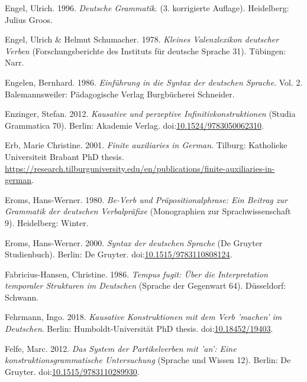 \leavevmode{}%
Engel, Ulrich. 1996. \emph{Deutsche {Grammatik}}. (3. korrigierte
Auflage). Heidelberg: Julius Groos.

\leavevmode{}%
Engel, Ulrich \& Helmut Schumacher. 1978. \emph{Kleines {Valenzlexikon}
deutscher {Verben}} ({Forschungsberichte des Instituts für deutsche
Sprache} 31). Tübingen: Narr.

\leavevmode{}%
Engelen, Bernhard. 1986. \emph{Einführung in die {Syntax} der deutschen
{Sprache}}. Vol. 2. Balemannsweiler: Pädagogische Verlag Burgbücherei
Schneider.

\leavevmode{}%
Enzinger, Stefan. 2012. \emph{Kausative und perzeptive
{Infinitivkonstruktionen}} (Studia Grammatica 70). Berlin: Akademie
Verlag.
doi:\href{https://doi.org/10.1524/9783050062310}{10.1524/9783050062310}.

\leavevmode{}%
Erb, Marie Christine. 2001. \emph{Finite auxiliaries in {German}}.
Tilburg: Katholieke Universiteit Brabant PhD thesis.
\url{https://research.tilburguniversity.edu/en/publications/finite-auxiliaries-in-german}.

\leavevmode{}%
Eroms, Hans-Werner. 1980. \emph{\emph{Be}-{Verb} und
{Präpositionalphrase}: Ein {Beitrag} zur {Grammatik} der deutschen
{Verbalpräfixe}} (Monographien {zur} Sprachwissenschaft 9). Heidelberg:
Winter.

\leavevmode{}%
Eroms, Hans-Werner. 2000. \emph{Syntax der deutschen {Sprache}} (De
Gruyter Studienbuch). Berlin: De Gruyter.
doi:\href{https://doi.org/10.1515/9783110808124}{10.1515/9783110808124}.

\leavevmode{}%
Fabricius-Hansen, Christine. 1986. \emph{Tempus fugit: Über die
{Interpretation} temporaler {Strukturen} im {Deutschen}} (Sprache {der}
Gegenwart 64). Düsseldorf: Schwann.

\leavevmode{}%
Fehrmann, Ingo. 2018. \emph{Kausative {Konstruktionen} mit dem {Verb}
'machen' im {Deutschen}}. Berlin: Humboldt-Universität PhD thesis.
doi:\href{https://doi.org/10.18452/19403}{10.18452/19403}.

\leavevmode{}%
Felfe, Marc. 2012. \emph{Das {System} der {Partikelverben} mit 'an':
Eine konstruktionsgrammatische {Untersuchung}} (Sprache {und} Wissen
12). Berlin: De Gruyter.
doi:\href{https://doi.org/10.1515/9783110289930}{10.1515/9783110289930}.

